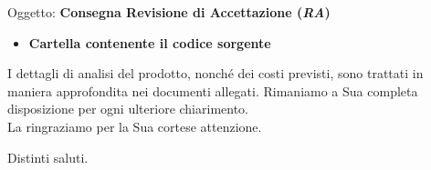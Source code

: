 \documentclass[a4paper,10pt]{letter}
\begin{document}
\begin{letter}{Oggetto: \textbf{Consegna Revisione di Accettazione (\textit{RA})}}
\begin{itemize}
\begin{itemize}
						\item Manuale Utente - v2.0			
						\item Manuale di Installazione- v1.0								
						\item Glossario - v4.0.
					\end{itemize}
					\item \textbf{Cartella contenente il codice sorgente}
			\end{itemize} 
		I dettagli di analisi del prodotto, nonché dei costi previsti, sono trattati in maniera approfondita nei documenti allegati. Rimaniamo a Sua completa disposizione per ogni ulteriore chiarimento.\\ 
		La ringraziamo per la Sua cortese attenzione.
\thispagestyle{fancy}
\closing{Distinti saluti.}
   \end{letter}
\end{document}
